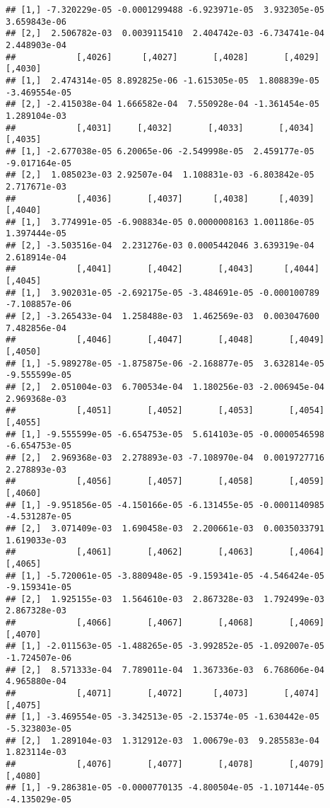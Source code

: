 \documentclass[
]{article}
\begin{document}
\begin{verbatim}
## [1,] -7.320229e-05 -0.0001299488 -6.923971e-05  3.932305e-05 3.659843e-06
## [2,]  2.506782e-03  0.0039115410  2.404742e-03 -6.734741e-04 2.448903e-04
##            [,4026]      [,4027]       [,4028]       [,4029]       [,4030]
## [1,]  2.474314e-05 8.892825e-06 -1.615305e-05  1.808839e-05 -3.469554e-05
## [2,] -2.415038e-04 1.666582e-04  7.550928e-04 -1.361454e-05  1.289104e-03
##            [,4031]     [,4032]       [,4033]       [,4034]       [,4035]
## [1,] -2.677038e-05 6.20065e-06 -2.549998e-05  2.459177e-05 -9.017164e-05
## [2,]  1.085023e-03 2.92507e-04  1.108831e-03 -6.803842e-05  2.717671e-03
##            [,4036]       [,4037]      [,4038]      [,4039]      [,4040]
## [1,]  3.774991e-05 -6.908834e-05 0.0000008163 1.001186e-05 1.397444e-05
## [2,] -3.503516e-04  2.231276e-03 0.0005442046 3.639319e-04 2.618914e-04
##            [,4041]       [,4042]       [,4043]      [,4044]       [,4045]
## [1,]  3.902031e-05 -2.692175e-05 -3.484691e-05 -0.000100789 -7.108857e-06
## [2,] -3.265433e-04  1.258488e-03  1.462569e-03  0.003047600  7.482856e-04
##            [,4046]       [,4047]       [,4048]       [,4049]       [,4050]
## [1,] -5.989278e-05 -1.875875e-06 -2.168877e-05  3.632814e-05 -9.555599e-05
## [2,]  2.051004e-03  6.700534e-04  1.180256e-03 -2.006945e-04  2.969368e-03
##            [,4051]       [,4052]       [,4053]       [,4054]       [,4055]
## [1,] -9.555599e-05 -6.654753e-05  5.614103e-05 -0.0000546598 -6.654753e-05
## [2,]  2.969368e-03  2.278893e-03 -7.108970e-04  0.0019727716  2.278893e-03
##            [,4056]       [,4057]       [,4058]       [,4059]       [,4060]
## [1,] -9.951856e-05 -4.150166e-05 -6.131455e-05 -0.0001140985 -4.531287e-05
## [2,]  3.071409e-03  1.690458e-03  2.200661e-03  0.0035033791  1.619033e-03
##            [,4061]       [,4062]       [,4063]       [,4064]       [,4065]
## [1,] -5.720061e-05 -3.880948e-05 -9.159341e-05 -4.546424e-05 -9.159341e-05
## [2,]  1.925155e-03  1.564610e-03  2.867328e-03  1.792499e-03  2.867328e-03
##            [,4066]       [,4067]       [,4068]       [,4069]       [,4070]
## [1,] -2.011563e-05 -1.488265e-05 -3.992852e-05 -1.092007e-05 -1.724507e-06
## [2,]  8.571333e-04  7.789011e-04  1.367336e-03  6.768606e-04  4.965880e-04
##            [,4071]       [,4072]      [,4073]       [,4074]       [,4075]
## [1,] -3.469554e-05 -3.342513e-05 -2.15374e-05 -1.630442e-05 -5.323803e-05
## [2,]  1.289104e-03  1.312912e-03  1.00679e-03  9.285583e-04  1.823114e-03
##            [,4076]       [,4077]       [,4078]       [,4079]       [,4080]
## [1,] -9.286381e-05 -0.0000770135 -4.800504e-05 -1.107144e-05 -4.135029e-05

\end{verbatim}
\end{document}
